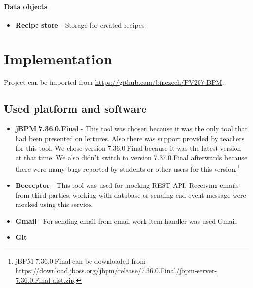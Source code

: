 \documentclass[11pt,a4paper]{article}
\begin{document}
\paragraph{Data objects}

\begin{itemize}
    \item \textbf{Recipe store} - Storage for created recipes.
\end{itemize}

\newpage




\section{Implementation}

Project can be imported from \url{https://github.com/binczech/PV207-BPM}.


\subsection{Used platform and software}

\begin{itemize}
    \item \textbf{jBPM 7.36.0.Final} - This tool was chosen because it was the only tool that had been presented on lectures. Also there was support provided by teachers for this tool. We chose version 7.36.0.Final because it was the latest version at that time. We also didn't switch to version 7.37.0.Final afterwards because there were many bugs reported by students or other users for this version.\footnote{jBPM 7.36.0.Final can be downloaded from \url{https://download.jboss.org/jbpm/release/7.36.0.Final/jbpm-server-7.36.0.Final-dist.zip}.}
    \item \textbf{Beeceptor} - This tool was used for mocking REST API. Receiving emails from third parties, working with database or sending end event message were mocked using this service.
    \item \textbf{Gmail} - For sending email from email work item handler was used Gmail.
    \item \textbf{Git}
\end{itemize}
\end{document}
